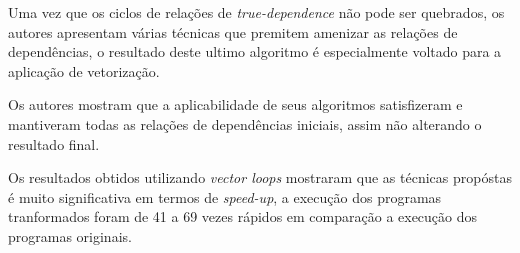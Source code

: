 Uma vez que os ciclos de relações de \textit{true-dependence} não pode ser
quebrados, os autores apresentam várias técnicas que premitem amenizar as
relações de dependências, o resultado deste ultimo algoritmo é especialmente
voltado para a aplicação de vetorização.

Os autores mostram que a aplicabilidade de seus algoritmos satisfizeram e
mantiveram todas as relações de dependências iniciais, assim não alterando o 
resultado final.

Os resultados obtidos utilizando \textit{vector loops} mostraram que as técnicas
propóstas é muito significativa em termos de \textit{speed-up}, a execução dos 
programas tranformados foram de 41 a 69 vezes rápidos em comparação a execução
dos programas originais.





